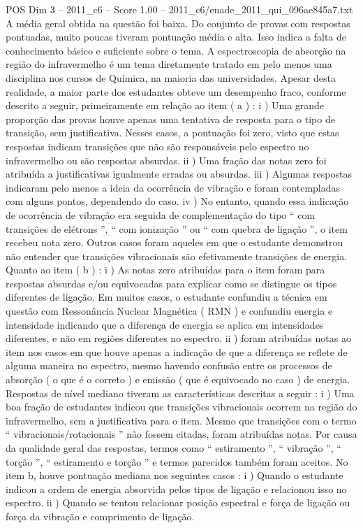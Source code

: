 \begin{textsample}{POS Dim 3 – 2011\_c6 – Score 1.00 – 2011\_c6/enade\_2011\_qui\_096ae845a7.txt}
A média geral obtida na questão foi baixa.
Do conjunto de provas com respostas pontuadas, muito poucas tiveram pontuação média e alta.
Isso indica a falta de conhecimento básico e suficiente sobre o tema.
A espectroscopia de absorção na região do infravermelho é um tema diretamente tratado em pelo menos uma disciplina nos cursos de Química, na maioria das universidades.
Apesar desta realidade, a maior parte dos estudantes obteve um desempenho fraco, conforme descrito a seguir, primeiramente em relação ao item ( a ) : i ) Uma grande proporção das provas houve apenas uma tentativa de resposta para o tipo de transição, sem justificativa.
Nesses casos, a pontuação foi zero, visto que estas respostas indicam transições que não são responsáveis pelo espectro no infravermelho ou são respostas absurdas. ii ) Uma fração das notas zero foi atribuída a justificativas igualmente erradas ou absurdas. iii ) Algumas respostas indicaram pelo menos a ideia da ocorrência de vibração e foram contempladas com alguns pontos, dependendo do caso. iv ) No entanto, quando essa indicação de ocorrência de vibração era seguida de complementação do tipo “ com transições de elétrons ”, “ com ionização ” ou “ com quebra de ligação ”, o item recebeu nota zero.
Outros casos foram aqueles em que o estudante demonstrou não entender que transições vibracionais são efetivamente transições de energia.
Quanto ao item ( b ) : i ) As notas zero atribuídas para o item foram para respostas absurdas e/ou equivocadas para explicar como se distingue os tipos diferentes de ligação.
Em muitos casos, o estudante confundiu a técnica em questão com Ressonância Nuclear Magnética ( RMN ) e confundiu energia e intensidade indicando que a diferença de energia se aplica em intensidades diferentes, e não em regiões diferentes no espectro. ii ) foram atribuídas notas ao item nos casos em que houve apenas a indicação de que a diferença se reflete de alguma maneira no espectro, mesmo havendo confusão entre os processos de absorção ( o que é o correto ) e emissão ( que é equivocado no caso ) de energia.
Respostas de nível mediano tiveram as características descritas a seguir : i ) Uma boa fração de estudantes indicou que transições vibracionais ocorrem na região do infravermelho, sem a justificativa para o item.
Mesmo que transições com o termo “ vibracionais/rotacionais ” não fossem citadas, foram atribuídas notas.
Por causa da qualidade geral das respostas, termos como “ estiramento ”, “ vibração ”, “ torção ”, “ estiramento e torção ” e termos parecidos também foram aceitos.
No item b, houve pontuação mediana nos seguintes casos : i ) Quando o estudante indicou a ordem de energia absorvida pelos tipos de ligação e relacionou isso no espectro. ii ) Quando se tentou relacionar posição espectral e força de ligação ou força da vibração e comprimento de ligação.

\end{textsample}
